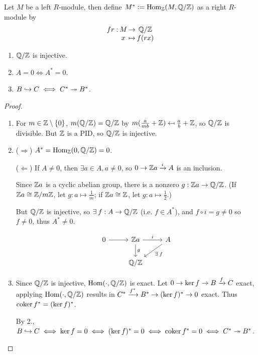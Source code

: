 \begin{definition}
  Let $M$ be a left $R$-module, then define
  $M^* \vcentcolon= \operatorname{Hom}_{\mathbb{Z}}(M, \mathbb{Q}/\mathbb{Z})$
  as a right $R$-module by 
  $$\deffunc{fr}{M}{\Qb/\Zb}{x}{f(rx)}$$
\end{definition}

\begin{fact} \mbox{}
  \begin{enumerate}
    \item $\mathbb{Q}/\mathbb{Z}$ is injective.
    \item $A = 0 \iff A^* = 0$.
    \item $B \hookrightarrow C \iff C^* \twoheadrightarrow B^*$.
  \end{enumerate}

  \begin{proof} \mbox{}
    \begin{enumerate}
      \item 
        For $m \in \mathbb{Z} \setminus \lbrace0\rbrace$, $m(\mathbb{Q}/\mathbb{Z}) = \mathbb{Q}/\mathbb{Z}$ by 
        $m(\frac{a}{mb} + \mathbb{Z}) \mapsfrom \frac{a}{b} + \mathbb{Z}$, so $\mathbb{Q}/\mathbb{Z}$ is divisible.
        But $\mathbb{Z}$ is a PID, so $\mathbb{Q}/\mathbb{Z}$ is injective.

      \item ($\Rightarrow$)
        $A^* = \operatorname{Hom}_{\mathbb{Z}}(0, \mathbb{Q}/\mathbb{Z}) = 0$.

        ($\Leftarrow$)
        If $A \neq 0$, then $\exists a \in A, a \neq 0$, so $0 \to \mathbb{Z} a \xrightarrow{i} A$ is an inclusion.

        Since $\mathbb{Z} a$ is a cyclic abelian group, there is a nonzero $g : \mathbb{Z} a \to \mathbb{Q}/\mathbb{Z}$.
        (If $\mathbb{Z} a \cong \mathbb{Z}/m\mathbb{Z}$, let $g : a \mapsto \frac{1}{m}$; 
        if $\mathbb{Z} a \cong \mathbb{Z}$, let $g : a \mapsto \frac{1}{2}$.)

        But $\mathbb{Q}/\mathbb{Z}$ is injective, so $\exists f : A \to \Qb/\Zb$ (i.e.
        $f \in A^*$), and $f \circ i = g \neq 0$ so $f \neq 0$, thus $A^* \neq 0$.

        $$
        \begin{tikzcd}
          0 \ar[r] & \Zb a \ar[r, "i"] \ar[d, "g"] & A \ar[ld, "\exists f"] \\
                   & \Qb/\Zb 
        \end{tikzcd}
        $$

      \item 
        Since $\mathbb{Q}/\mathbb{Z}$ is injective, $\operatorname{Hom}(\cdot, \mathbb{Q}/\mathbb{Z})$ is exact.
        Let $0 \to \ker f \to B \xrightarrow{f} C$ exact, applying $\operatorname{Hom}(\cdot, \mathbb{Q}/\mathbb{Z})$
        results in
        $C^* \xrightarrow{f^*} B^* \to (\ker f)^* \to 0$ exact.
        Thus $\operatorname{coker} f^* = (\ker f)^*$.

        By 2., $B \hookrightarrow C \iff \ker f = 0 \iff (\ker f)^* = 0 \iff \operatorname{coker} f^* = 0 
        \iff C^* \twoheadrightarrow B^*$.
    \end{enumerate}
  \end{proof}
\end{fact}

